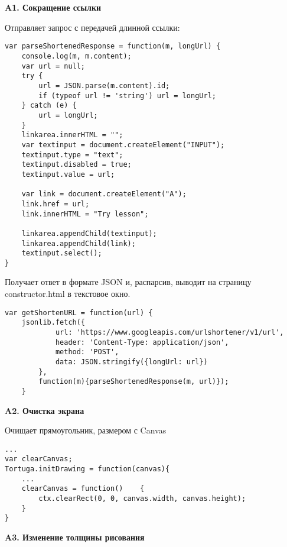 \appendix
\chapter{} \label{AppendixA}

\textbf{\Large A1. Сокращение ссылки}
\vspace{6mm}

Отправляет запрос с передачей длинной ссылки:
\begin{verbatim}
var parseShortenedResponse = function(m, longUrl) {
    console.log(m, m.content);
    var url = null;
    try {                
        url = JSON.parse(m.content).id;
        if (typeof url != 'string') url = longUrl;
    } catch (e) {
        url = longUrl;
    }
	linkarea.innerHTML = "";			
	var textinput = document.createElement("INPUT");
	textinput.type = "text";
	textinput.disabled = true;
	textinput.value = url;

	var link = document.createElement("A");
	link.href = url;
	link.innerHTML = "Try lesson";

	linkarea.appendChild(textinput);
	linkarea.appendChild(link);
	textinput.select();
}

\end{verbatim}

Получает ответ в формате JSON и, распарсив, выводит на страницу  constructor.html в текстовое окно.
\begin{verbatim}
var getShortenURL = function(url) {
    jsonlib.fetch({
            url: 'https://www.googleapis.com/urlshortener/v1/url',
            header: 'Content-Type: application/json',
            method: 'POST',
            data: JSON.stringify({longUrl: url})
        }, 
        function(m){parseShortenedResponse(m, url)});
    }
\end{verbatim}

\vspace{16mm}
\textbf{\Large A2. Очистка экрана}
\vspace{6mm}

Очищает прямоугольник, размером с Canvas 
\begin{verbatim}
...
var clearCanvas;
Tortuga.initDrawing = function(canvas){
	...
    clearCanvas = function()	{
        ctx.clearRect(0, 0, canvas.width, canvas.height);
    }
}
\end{verbatim}

\vspace{16mm}
\textbf{\Large A3. Изменение толщины рисования}
\vspace{6mm}

